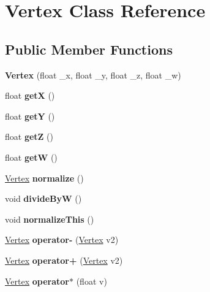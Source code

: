 \hypertarget{class_vertex}{}\section{Vertex Class Reference}
\label{class_vertex}
\subsection*{Public Member Functions}
\begin{DoxyCompactItemize}
\item 
\mbox{\label{class_vertex_af28074c8f359c2c815ef2f164bf6355b}} 
{\bfseries Vertex} (float \+\_\+x, float \+\_\+y, float \+\_\+z, float \+\_\+w)
\item 
\mbox{\label{class_vertex_aa78d4c3433559e6e50260240c49a3d03}} 
float {\bfseries getX} ()
\item 
\mbox{\label{class_vertex_a12facdc9f554fd718e449f2aa2eefeaf}} 
float {\bfseries getY} ()
\item 
\mbox{\label{class_vertex_a258fea59f7c07f4e8784fc90c6ac7cb3}} 
float {\bfseries getZ} ()
\item 
\mbox{\label{class_vertex_a6957f8fb928fb151b260efc8dfe10455}} 
float {\bfseries getW} ()
\item 
\mbox{\label{class_vertex_a5d5284346279af944480cce75013dfa7}} 
\hyperlink{class_vertex}{Vertex} {\bfseries normalize} ()
\item 
\mbox{\label{class_vertex_af7e2b7c7b9cba4ff94f9bca7bc389e2e}} 
void {\bfseries divide\+ByW} ()
\item 
\mbox{\label{class_vertex_a16cdfc490098f9d1e59a134d842f7039}} 
void {\bfseries normalize\+This} ()
\item 
\mbox{\label{class_vertex_a287781f2ff321c0734662ff48008ad52}} 
\hyperlink{class_vertex}{Vertex} {\bfseries operator-\/} (\hyperlink{class_vertex}{Vertex} v2)
\item 
\mbox{\label{class_vertex_a9664c1135530ea8a00ba4df5fae13bf1}} 
\hyperlink{class_vertex}{Vertex} {\bfseries operator+} (\hyperlink{class_vertex}{Vertex} v2)
\item 
\mbox{\label{class_vertex_a7f9ab7e0df3e5c72faf8069379a88a89}} 
\hyperlink{class_vertex}{Vertex} {\bfseries operator$\ast$} (float v)
\end{DoxyCompactItemize}
